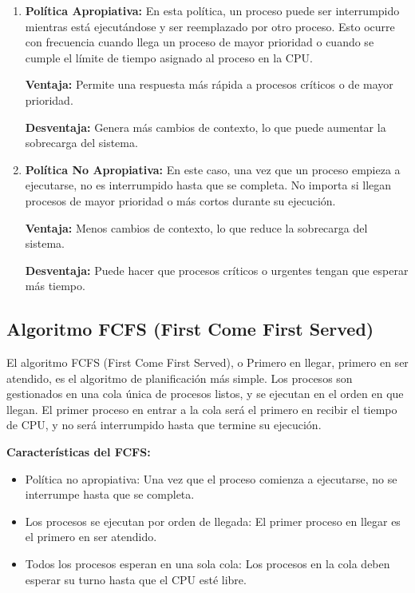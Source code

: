 \begin{enumerate}
	\item \textbf{Política Apropiativa:}
	En esta política, un proceso puede ser interrumpido mientras está ejecutándose y ser reemplazado por otro proceso. Esto ocurre con frecuencia cuando llega un proceso de mayor prioridad o cuando se cumple el límite de tiempo asignado al proceso en la CPU.
		
	\textbf{Ventaja:} Permite una respuesta más rápida a procesos críticos o de mayor prioridad.
	
	\textbf{Desventaja:} Genera más cambios de contexto, lo que puede aumentar la sobrecarga del sistema.
	\item \textbf{Política No Apropiativa:}
	En este caso, una vez que un proceso empieza a ejecutarse, no es interrumpido hasta que se completa. No importa si llegan procesos de mayor prioridad o más cortos durante su ejecución.
	
	\textbf{Ventaja:} Menos cambios de contexto, lo que reduce la sobrecarga del sistema.
	
	\textbf{Desventaja:} Puede hacer que procesos críticos o urgentes tengan que esperar más tiempo.
	
\end{enumerate}





\subsection{Algoritmo FCFS (First Come First Served)} El algoritmo FCFS (First Come First Served), o Primero en llegar, primero en ser atendido, es el algoritmo de planificación más simple. Los procesos son gestionados en una cola única de procesos listos, y se ejecutan en el orden en que llegan. El primer proceso en entrar a la cola será el primero en recibir el tiempo de CPU, y no será interrumpido hasta que termine su ejecución.

\textbf{Características del FCFS:}
\begin{itemize} \item Política no apropiativa: Una vez que el proceso comienza a ejecutarse, no se interrumpe hasta que se completa. \item Los procesos se ejecutan por orden de llegada: El primer proceso en llegar es el primero en ser atendido. \item Todos los procesos esperan en una sola cola: Los procesos en la cola deben esperar su turno hasta que el CPU esté libre. \end{itemize}

